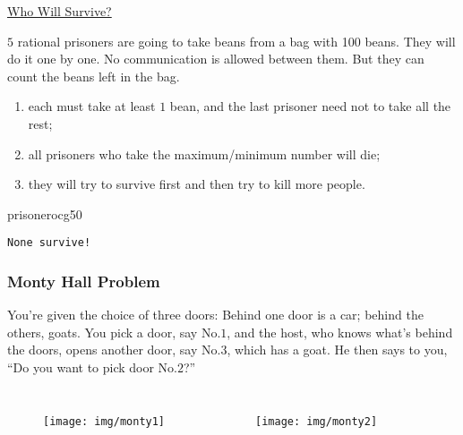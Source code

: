 \documentclass[UTF8,11pt,colorlinks,compress,openany]{beamer}%
\begin{document}
\begin{frame}[fragile]{\href{https://www.zhihu.com/question/19912025/answer/99088775}{Who Will Survive?}}
	\begin{problem}
		$5$ rational prisoners are going to take beans from a bag with 100 beans. They will do it one by one. No communication is allowed between them. But they can count the beans left in the bag.
		\begin{enumerate}
			\item each must take at least $1$ bean, and the last prisoner need not to take all the rest;
			\item all prisoners who take the maximum/minimum number will die;
			\item they will try to survive first and then try to kill more people.
		\end{enumerate}
	\end{problem}
\begin{ocg}{prisoner}{ocg5}{0}
\begin{verbatim}
None survive!
\end{verbatim}
\end{ocg}
\end{frame}

\begin{frame}\frametitle{Monty Hall Problem}
	\begin{problem}
		You're given the choice of three doors: Behind one door is a car; behind the others, goats. You pick a door, say No.$1$, and the host, who knows what's behind the doors, opens another door, say No.$3$, which has a goat. He then says to you, ``Do you want to pick door No.$2$?''
	\end{problem}
	\begin{columns}
			\begin{figure}
				\texttt{[image: img/monty1]}
			\end{figure}
			\begin{figure}
				\texttt{[image: img/monty2]}
			\end{figure}
	\end{columns}
\end{frame}
\end{document}
